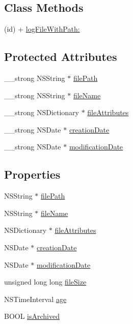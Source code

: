 \subsection*{Class Methods}
\begin{DoxyCompactItemize}
\item 
(id) + \hyperlink{interface_d_d_log_file_info_aff0e31bcc40a4ce6c76572a06c0fe36b}{log\-File\-With\-Path\-:}
\end{DoxyCompactItemize}
\subsection*{Protected Attributes}
\begin{DoxyCompactItemize}
\item 
\-\_\-\-\_\-strong N\-S\-String $\ast$ \hyperlink{interface_d_d_log_file_info_a645c6828b8e17494603ac78cbae539ea}{file\-Path}
\item 
\-\_\-\-\_\-strong N\-S\-String $\ast$ \hyperlink{interface_d_d_log_file_info_a87b064e197bcd8b828697220ef7bf671}{file\-Name}
\item 
\-\_\-\-\_\-strong N\-S\-Dictionary $\ast$ \hyperlink{interface_d_d_log_file_info_aacfb5972d3e5b709e7ba428ec6dba888}{file\-Attributes}
\item 
\-\_\-\-\_\-strong N\-S\-Date $\ast$ \hyperlink{interface_d_d_log_file_info_a1d23d99413a1bc3a8e67b97cc6ed0355}{creation\-Date}
\item 
\-\_\-\-\_\-strong N\-S\-Date $\ast$ \hyperlink{interface_d_d_log_file_info_a5ccaf2bb1e330d206323eb0e89f32bf3}{modification\-Date}
\end{DoxyCompactItemize}
\subsection*{Properties}
\begin{DoxyCompactItemize}
\item 
N\-S\-String $\ast$ \hyperlink{interface_d_d_log_file_info_a560ae240bab6235f7e577ced2f027a89}{file\-Path}
\item 
N\-S\-String $\ast$ \hyperlink{interface_d_d_log_file_info_a0477a32511d71b0117f8a2a61295a555}{file\-Name}
\item 
N\-S\-Dictionary $\ast$ \hyperlink{interface_d_d_log_file_info_ade04f79d49d9c9cdee83d418b413b3f4}{file\-Attributes}
\item 
N\-S\-Date $\ast$ \hyperlink{interface_d_d_log_file_info_a5174798812e67485161ac1c14ff45889}{creation\-Date}
\item 
N\-S\-Date $\ast$ \hyperlink{interface_d_d_log_file_info_a2e22c1315c04069c65ad59a083e6e8c8}{modification\-Date}
\item 
unsigned long long \hyperlink{interface_d_d_log_file_info_afb6644d12ab6c19ae5fa621a2d47dba4}{file\-Size}
\item 
N\-S\-Time\-Interval \hyperlink{interface_d_d_log_file_info_ad1a0d9eef7ba877f9fed50ec123d307f}{age}
\item 
B\-O\-O\-L \hyperlink{interface_d_d_log_file_info_ae1eaeab42cc10fe4a0069189b009278a}{is\-Archived}
\end{DoxyCompactItemize}


